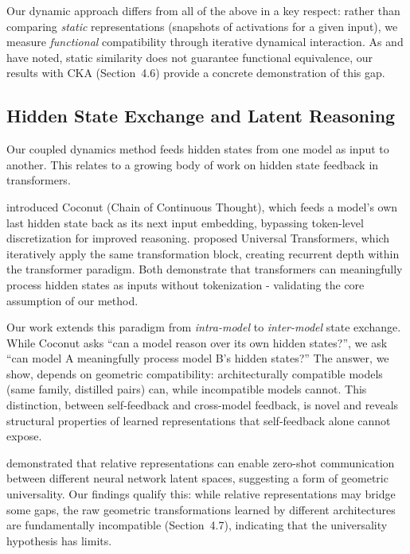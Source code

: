 \documentclass[10pt]{article} %
\theoremstyle{plain}
\theoremstyle{definition}
\theoremstyle{remark}
\begin{document}
Our dynamic approach differs from all of the above in a key respect: rather than comparing \textit{static} representations (snapshots of activations for a given input), we measure \textit{functional} compatibility through iterative dynamical interaction. As \citet{hauser2021similar} and \citet{nguyen2021wide} have noted, static similarity does not guarantee functional equivalence, our results with CKA (Section~4.6) provide a concrete demonstration of this gap.

\subsection{Hidden State Exchange and Latent Reasoning}

Our coupled dynamics method feeds hidden states from one model as input to another. This relates to a growing body of work on hidden state feedback in transformers.

\citet{hao2024coconut} introduced Coconut (Chain of Continuous Thought), which feeds a model's own last hidden state back as its next input embedding, bypassing token-level discretization for improved reasoning. \citet{dehghani2019universal} proposed Universal Transformers, which iteratively apply the same transformation block, creating recurrent depth within the transformer paradigm. Both demonstrate that transformers can meaningfully process hidden states as inputs without tokenization - validating the core assumption of our method.

Our work extends this paradigm from \textit{intra-model} to \textit{inter-model} state exchange. While Coconut asks ``can a model reason over its own hidden states?'', we ask ``can model A meaningfully process model B's hidden states?'' The answer, we show, depends on geometric compatibility: architecturally compatible models (same family, distilled pairs) can, while incompatible models cannot. This distinction, between self-feedback and cross-model feedback, is novel and reveals structural properties of learned representations that self-feedback alone cannot expose.

\citet{moschella2023relative} demonstrated that relative representations can enable zero-shot communication between different neural network latent spaces, suggesting a form of geometric universality. Our findings qualify this: while relative representations may bridge some gaps, the raw geometric transformations learned by different architectures are fundamentally incompatible (Section~4.7), indicating that the universality hypothesis has limits.
\end{document}
